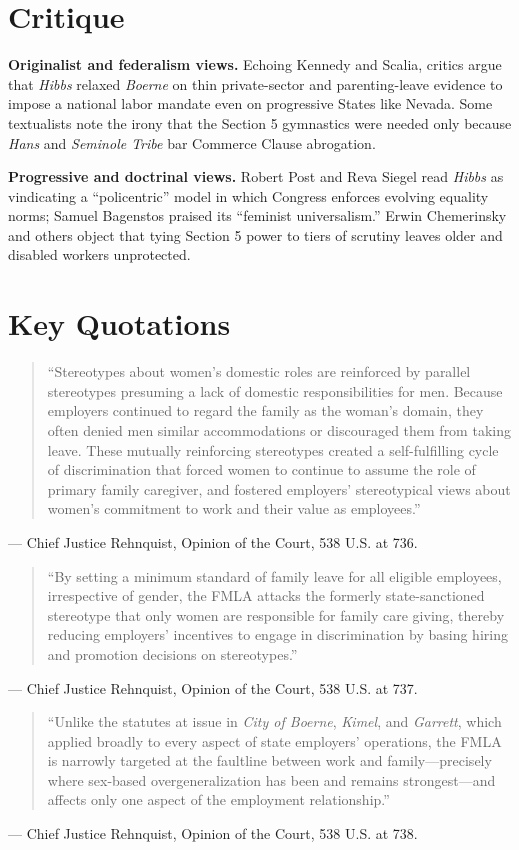 \documentclass[12pt]{article}
\begin{document}
\section{Critique}

\textbf{Originalist and federalism views.} Echoing Kennedy and Scalia, critics argue that \textit{Hibbs} relaxed \textit{Boerne} on thin private-sector and parenting-leave evidence to impose a national labor mandate even on progressive States like Nevada. Some textualists note the irony that the Section 5 gymnastics were needed only because \textit{Hans} and \textit{Seminole Tribe} bar Commerce Clause abrogation.

\textbf{Progressive and doctrinal views.} Robert Post and Reva Siegel read \textit{Hibbs} as vindicating a ``policentric'' model in which Congress enforces evolving equality norms; Samuel Bagenstos praised its ``feminist universalism.'' Erwin Chemerinsky and others object that tying Section 5 power to tiers of scrutiny leaves older and disabled workers unprotected.

\section{Key Quotations}

\begin{quote}
``Stereotypes about women's domestic roles are reinforced by parallel stereotypes presuming a lack of domestic responsibilities for men. Because employers continued to regard the family as the woman's domain, they often denied men similar accommodations or discouraged them from taking leave. These mutually reinforcing stereotypes created a self-fulfilling cycle of discrimination that forced women to continue to assume the role of primary family caregiver, and fostered employers' stereotypical views about women's commitment to work and their value as employees.''
\end{quote}
\noindent --- Chief Justice Rehnquist, Opinion of the Court, 538 U.S. at 736.

\begin{quote}
``By setting a minimum standard of family leave for all eligible employees, irrespective of gender, the FMLA attacks the formerly state-sanctioned stereotype that only women are responsible for family care giving, thereby reducing employers' incentives to engage in discrimination by basing hiring and promotion decisions on stereotypes.''
\end{quote}
\noindent --- Chief Justice Rehnquist, Opinion of the Court, 538 U.S. at 737.

\begin{quote}
``Unlike the statutes at issue in \textit{City of Boerne}, \textit{Kimel}, and \textit{Garrett}, which applied broadly to every aspect of state employers' operations, the FMLA is narrowly targeted at the faultline between work and family---precisely where sex-based overgeneralization has been and remains strongest---and affects only one aspect of the employment relationship.''
\end{quote}
\noindent --- Chief Justice Rehnquist, Opinion of the Court, 538 U.S. at 738.
\end{document}
